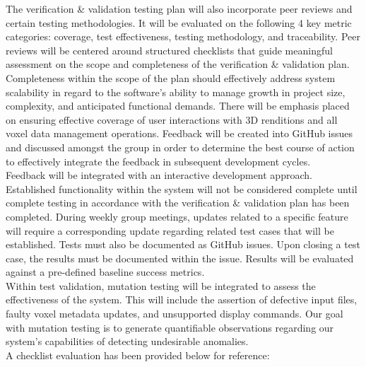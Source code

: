 \documentclass[12pt, titlepage]{article}
\begin{document}
The verification \& validation testing plan will also incorporate peer reviews and certain testing methodologies. It will be evaluated on the following 4 key metric categories: coverage, test effectiveness, testing methodology, and traceability. Peer reviews will be centered around structured checklists that guide meaningful assessment on the scope and completeness of the verification \& validation plan. Completeness within the scope of the plan should effectively address system scalability in regard to the software’s ability to manage growth in project size, complexity, and anticipated functional demands. There will be emphasis placed on ensuring effective coverage of user interactions with 3D renditions and all voxel data management operations. Feedback will be created into GitHub issues and discussed amongst the group in order to determine the best course of action to effectively integrate the feedback in subsequent development cycles.\\

\noindent Feedback will be integrated with an interactive development approach. Established functionality within the system will not be considered complete until complete testing in accordance with the verification \& validation plan has been completed. During weekly group meetings, updates related to a specific feature will require a corresponding update regarding related test cases that will be established. Tests must also be documented as GitHub issues. Upon closing a test case, the results must be documented within the issue. Results will be evaluated against a pre-defined baseline success metrics. \\

\noindent Within test validation, mutation testing will be integrated to assess the effectiveness of the system. This will include the assertion of defective input files, faulty voxel metadata updates, and unsupported display commands. Our goal with mutation testing is to generate quantifiable observations regarding our system’s capabilities of detecting undesirable anomalies.\\

\noindent A checklist evaluation has been provided below for reference:\\
\end{document}
